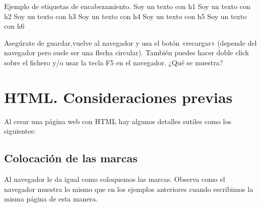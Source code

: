 \documentclass[a4paper,12pt,spanish]{sphinxmanual}
\begin{document}
%
\begin{sphinxVerbatim}[commandchars=\\\{\}]
         Ejemplo de etiquetas de encabezamiento.
     Soy un texto con h1
     Soy un texto con h2
     Soy un texto con h3
     Soy un texto con h4
     Soy un texto con h5
     Soy un texto con h6
\end{sphinxVerbatim}

Asegúrate de guardar,vuelve al navegador y usa el botón «recargar» (depende del navegador pero suele ser una flecha circular). También puedes hacer doble click sobre el fichero y/o usar la tecla F5 en el navegador. ¿Qué se muestra?


\chapter{HTML. Consideraciones previas}
\label{\detokenize{index:html-consideraciones-previas}}
Al crear una página web con HTML hay algunos detalles sutiles como los siguientes:


\section{Colocación de las marcas}
\label{\detokenize{index:colocacion-de-las-marcas}}
Al navegador le da igual como coloquemos las marcas. Observa como el navegador muestra lo mismo que en los ejemplos anteriores cuando escribimos la misma página de esta manera.
\end{document}
